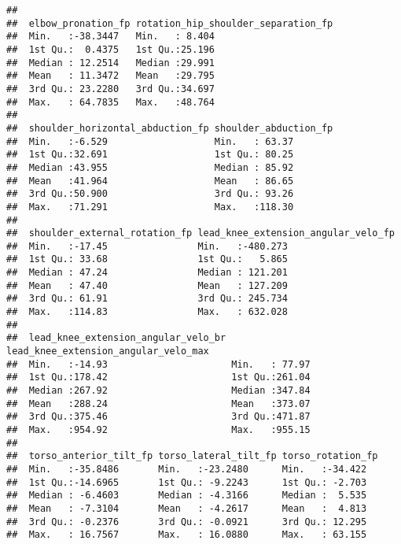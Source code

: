 \documentclass[
]{article}
\begin{document}
\begin{verbatim}
##                                                                   
##  elbow_pronation_fp rotation_hip_shoulder_separation_fp
##  Min.   :-38.3447   Min.   : 8.404                     
##  1st Qu.:  0.4375   1st Qu.:25.196                     
##  Median : 12.2514   Median :29.991                     
##  Mean   : 11.3472   Mean   :29.795                     
##  3rd Qu.: 23.2280   3rd Qu.:34.697                     
##  Max.   : 64.7835   Max.   :48.764                     
##                                                        
##  shoulder_horizontal_abduction_fp shoulder_abduction_fp
##  Min.   :-6.529                   Min.   : 63.37       
##  1st Qu.:32.691                   1st Qu.: 80.25       
##  Median :43.955                   Median : 85.92       
##  Mean   :41.964                   Mean   : 86.65       
##  3rd Qu.:50.900                   3rd Qu.: 93.26       
##  Max.   :71.291                   Max.   :118.30       
##                                                        
##  shoulder_external_rotation_fp lead_knee_extension_angular_velo_fp
##  Min.   :-17.45                Min.   :-480.273                   
##  1st Qu.: 33.68                1st Qu.:   5.865                   
##  Median : 47.24                Median : 121.201                   
##  Mean   : 47.40                Mean   : 127.209                   
##  3rd Qu.: 61.91                3rd Qu.: 245.734                   
##  Max.   :114.83                Max.   : 632.028                   
##                                                                   
##  lead_knee_extension_angular_velo_br lead_knee_extension_angular_velo_max
##  Min.   :-14.93                      Min.   : 77.97                      
##  1st Qu.:178.42                      1st Qu.:261.04                      
##  Median :267.92                      Median :347.84                      
##  Mean   :288.24                      Mean   :373.07                      
##  3rd Qu.:375.46                      3rd Qu.:471.87                      
##  Max.   :954.92                      Max.   :955.15                      
##                                                                          
##  torso_anterior_tilt_fp torso_lateral_tilt_fp torso_rotation_fp
##  Min.   :-35.8486       Min.   :-23.2480      Min.   :-34.422  
##  1st Qu.:-14.6965       1st Qu.: -9.2243      1st Qu.: -2.703  
##  Median : -6.4603       Median : -4.3166      Median :  5.535  
##  Mean   : -7.3104       Mean   : -4.2617      Mean   :  4.813  
##  3rd Qu.: -0.2376       3rd Qu.: -0.0921      3rd Qu.: 12.295  
##  Max.   : 16.7567       Max.   : 16.0880      Max.   : 63.155  

\end{verbatim}
\end{document}

